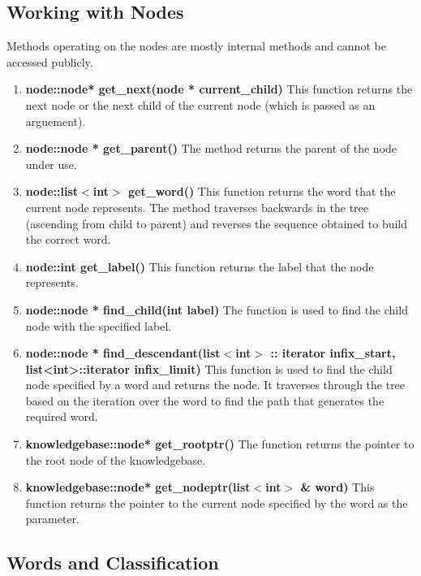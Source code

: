 \subsection*{Working with Nodes}
	Methods operating on the nodes are mostly internal methods and cannot be accessed publicly.
\begin{enumerate}
\item \textbf{node::node* get\_next(node * current\_child)} \vskip 1pt
	This function returns the next node or the next child of the current node (which is passed as an arguement). 
	
\item \textbf{node::node * get\_parent()} \vskip 1pt
	The method returns the parent of the node under use.

\item \textbf{node::list$<$int$>$ get\_word()} \vskip 1pt
	This function returns the word that the current node represents. The method traverses backwards in the tree (ascending from child to parent) and reverses the sequence obtained to build the correct word.
	
\item \textbf{node::int get\_label()} \hfill \vskip 1pt
	This function returns the label that the node represents.
	
\item \textbf{node::node * find\_child(int label)} \hfill \vskip 1pt
	The function is used to find the child node with the specified label.
	
\item \textbf{node::node * find\_descendant(list$<$int$>$ :: iterator infix\_start, list<int>::iterator infix\_limit)} \hfill \vskip 1pt
	This function is used to find the child node specified by a word and returns the node. It traverses through the tree based on the iteration over the word to find the path that generates the required word.
	
\item \textbf{knowledgebase::node* get\_rootptr()} \hfill \vskip 1pt
	The function returns the pointer to the root node of the knowledgebase.
	
\item \textbf{knowledgebase::node* get\_nodeptr(list$<$int$>$ \& word)} \hfill \vskip 1pt
	This function returns the pointer to the current node specified by the word as the parameter.
	
\end{enumerate}

\subsection*{Words and Classification}

